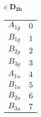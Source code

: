 \documentclass[12pt]{article}
\begin{document}
\vspace{1cm}

\begin{tabular}{c}
  $\mathbf{D_{2h}}$ \\
  \begin{tabular}{|c|c|}
    \hline
    $A_{1g}$ & $0$ \\
    $B_{1g}$ & $1$ \\
    $B_{2g}$ & $2$ \\
    $B_{3g}$ & $3$ \\
    $A_{1u}$ & $4$ \\
    $B_{1u}$ & $5$ \\
    $B_{2u}$ & $6$ \\
    $B_{3u}$ & $7$ \\
    \hline
  \end{tabular} \\
\end{tabular}
\end{document}
